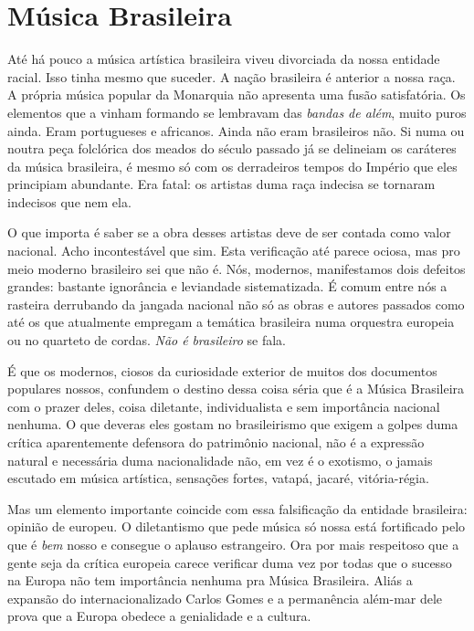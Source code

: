 \section{Música Brasileira}

Até há pouco a música artística brasileira viveu divorciada da nossa
entidade racial. Isso tinha mesmo que suceder. A nação brasileira é
anterior a nossa raça. A própria música popular da Monarquia não
apresenta uma fusão satisfatória. Os elementos que a vinham formando se
lembravam das \emph{bandas de além}, muito puros ainda. Eram portugueses
e africanos. Ainda não eram brasileiros não. Si numa ou noutra peça
folclórica dos meados do século passado já se delineiam os caráteres da
música brasileira, é mesmo só com os derradeiros tempos do Império que
eles principiam abundante. Era fatal: os artistas duma raça indecisa se
tornaram indecisos que nem ela.

O que importa é saber se a obra desses artistas deve de ser contada como
valor nacional. Acho incontestável que sim. Esta verificação até parece
ociosa, mas pro meio moderno brasileiro sei que não
é. Nós, modernos, manifestamos dois defeitos grandes:
bastante ignorância e leviandade sistematizada. É comum entre nós a
rasteira derrubando da jangada nacional não só as obras e autores
passados como até os que atualmente empregam a temática brasileira numa
orquestra europeia ou no quarteto de cordas. \emph{Não é}
\emph{brasileiro} se fala.

É que os modernos, ciosos da curiosidade exterior de muitos dos
documentos populares nossos, confundem o destino dessa coisa séria que é
a Música Brasileira com o prazer deles, coisa diletante, individualista
e sem importância nacional nenhuma. O que deveras eles gostam no
brasileirismo que exigem a golpes duma crítica aparentemente defensora
do patrimônio nacional, não é a expressão natural e necessária duma
nacionalidade não, em vez é o exotismo, o jamais escutado em música
artística, sensações fortes, vatapá, jacaré, vitória-régia.

Mas um elemento importante coincide com essa falsificação da entidade
brasileira: opinião de europeu. O diletantismo que pede música só nossa
está fortificado pelo que é \emph{bem} nosso e consegue o aplauso
estrangeiro. Ora por mais respeitoso que a gente seja da crítica
europeia carece verificar duma vez por todas que o sucesso na Europa não
tem importância nenhuma pra Música Brasileira. Aliás a expansão do
internacionalizado Carlos Gomes e a permanência além-mar dele prova que
a Europa obedece a genialidade e a cultura.

